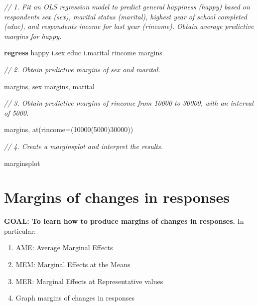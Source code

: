 \documentclass[
]{book}
\newenvironment{Shaded}{\begin{snugshade}}{\end{snugshade}}
\newcommand{\CommentTok}[1]{\textcolor[rgb]{0.56,0.35,0.01}{\textit{#1}}}
\newcommand{\FunctionTok}[1]{\textcolor[rgb]{0.00,0.00,0.00}{#1}}
\newcommand{\KeywordTok}[1]{\textcolor[rgb]{0.13,0.29,0.53}{\textbf{#1}}}
\newcommand{\NormalTok}[1]{#1}
\providecommand{\tightlist}{%
  \setlength{\itemsep}{0pt}\setlength{\parskip}{0pt}}
\begin{document}
\begin{alert}

\begin{Shaded}
\begin{Highlighting}[]
\CommentTok{// 1. Fit an OLS regression model to predict general happiness (\textasciigrave{}happy\textasciigrave{}) based on respondent\textquotesingle{}s sex (\textasciigrave{}sex\textasciigrave{}), marital status (\textasciigrave{}marital\textasciigrave{}), highest year of school completed (\textasciigrave{}educ\textasciigrave{}), and respondent\textquotesingle{}s income for last year (\textasciigrave{}rincome\textasciigrave{}). Obtain average predictive margins for \textasciigrave{}happy\textasciigrave{}.}

\KeywordTok{regress}\NormalTok{ happy i.sex educ i.marital rincome}
\NormalTok{margins }

\CommentTok{// 2. Obtain predictive margins of \textasciigrave{}sex\textasciigrave{} and \textasciigrave{}marital\textasciigrave{}. }

\NormalTok{margins, sex }
\NormalTok{margins, marital}

\CommentTok{// 3. Obtain predictive margins of \textasciigrave{}rincome\textasciigrave{} from 10000 to 30000, with an interval of 5000. }

\NormalTok{margins, }\FunctionTok{at}\NormalTok{(rincome=(10000(5000)30000))}

\CommentTok{// 4. Create a \textasciigrave{}marginsplot\textasciigrave{} and interpret the results. }

\NormalTok{marginsplot }
\end{Highlighting}
\end{Shaded}

\end{alert}

\hypertarget{margins-of-changes-in-responses}{%
\section{Margins of changes in responses}\label{margins-of-changes-in-responses}}

\begin{alert}

\textbf{GOAL: To learn how to produce margins of changes in responses.} In particular:

\begin{enumerate}
\def\labelenumi{\arabic{enumi}.}
\tightlist
\item
  AME: Average Marginal Effects
\item
  MEM: Marginal Effects at the Means
\item
  MER: Marginal Effects at Representative values
\item
  Graph margins of changes in responses
\end{enumerate}

\end{alert}
\end{document}
